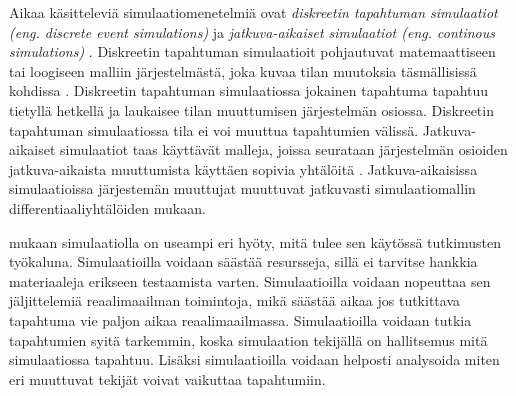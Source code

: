 \documentclass[utf8]{gradu3}
\begin{document}
Aikaa käsitteleviä simulaatiomenetelmiä ovat 
\textit{diskreetin tapahtuman simulaatiot (eng. discrete event simulations)}
ja \textit{jatkuva-aikaiset simulaatiot  (eng. continous simulations)}
\parencite{historyOfSimulation1996}.
Diskreetin tapahtuman simulaatioit pohjautuvat matemaattiseen tai loogiseen
malliin järjestelmästä, joka kuvaa tilan muutoksia täsmällisissä kohdissa
\parencite{historyOfSimulation1996}. 
Diskreetin tapahtuman simulaatiossa jokainen tapahtuma tapahtuu tietyllä 
hetkellä ja laukaisee tilan muuttumisen järjestelmän osiossa.
Diskreetin tapahtuman simulaatiossa  tila ei voi muuttua tapahtumien välissä.
Jatkuva-aikaiset simulaatiot taas käyttävät malleja, joissa seurataan 
järjestelmän osioiden jatkuva-aikaista muuttumista käyttäen sopivia 
yhtälöitä \parencite{historyOfSimulation1996}. 
Jatkuva-aikaisissa simulaatioissa järjestemän muuttujat muuttuvat 
jatkuvasti simulaatiomallin differentiaaliyhtälöiden mukaan.

\cite{banks1999introduction} mukaan simulaatiolla on useampi eri hyöty, 
mitä tulee sen käytössä tutkimusten työkaluna. 
Simulaatioilla voidaan säästää resursseja, sillä ei tarvitse hankkia materiaaleja erikseen testaamista varten. 
Simulaatioilla voidaan nopeuttaa sen jäljittelemiä reaalimaailman toimintoja,
mikä säästää aikaa jos tutkittava tapahtuma vie paljon aikaa reaalimaailmassa. Simulaatioilla voidaan tutkia tapahtumien syitä tarkemmin, koska simulaation tekijällä on hallitsemus mitä simulaatiossa tapahtuu.
Lisäksi simulaatioilla voidaan helposti analysoida miten eri muuttuvat tekijät voivat vaikuttaa tapahtumiin. 
\end{document}
